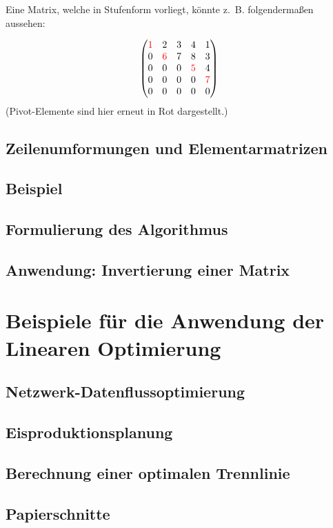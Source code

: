 \documentclass{scrartcl}
\begin{document}
Eine Matrix, welche in Stufenform vorliegt, könnte z.~B. folgendermaßen aussehen:

\[ \begin{pmatrix}{\color{red}1}& 2 & 3 & 4 & 1\\ 0 &{\color{red}6}& 7 & 8 & 3 \\ 0 & 0 & 0 &{\color{red}5}& 4 \\ 0 &0& 0 & 0 &{\color{red}7}\\ 0 & 0 &0& 0 & 0\end{pmatrix} \]
(Pivot-Elemente sind hier erneut in Rot dargestellt.)

\subsection{Zeilenumformungen und Elementarmatrizen}


\subsection{Beispiel}


\subsection{Formulierung des Algorithmus}


\subsection{Anwendung: Invertierung einer Matrix}



\section{Beispiele für die Anwendung der Linearen Optimierung}

\subsection{Netzwerk-Datenflussoptimierung}

\subsection{Eisproduktionsplanung}

\subsection{Berechnung einer optimalen Trennlinie}

\subsection{Papierschnitte}

\end{document}
